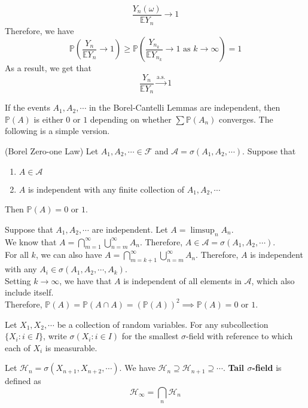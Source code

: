 \documentclass{huhtakm-template-book}
\newcommand{\prob}{\mathbb{P}}
\newcommand{\expect}{\mathbb{E}}
\begin{document}
\begin{proofing}
	\begin{equation*}
		\frac{Y_{n}(\omega)}{\expect Y_{n}}\to 1
	\end{equation*}
	Therefore, we have
	\begin{equation*}
		\prob\left(\frac{Y_{n}}{\expect Y_{n}}\to 1\right)\geq\prob\left(\frac{Y_{n_{k}}}{\expect Y_{n_{k}}}\to 1\text{ as }k\to\infty\right)=1
	\end{equation*}
	As a result, we get that
	\begin{equation*}
		\frac{Y_{n}}{\expect Y_{n}}\xrightarrow{\text{a.s.}}1
	\end{equation*}
\end{proofing}
If the events $A_{1}, A_{2},\cdots$ in the Borel-Cantelli Lemmas are independent, then $\prob(A)$ is either $0$ or $1$ depending on whether $\sum\prob(A_{n})$ converges. The following is a simple version.
\begin{thm}(Borel Zero-one Law)
	Let $A_{1},A_{2},\cdots\in\mathcal{F}$ and $\mathcal{A}=\sigma(A_{1},A_{2},\cdots)$. Suppose that
	\begin{enumerate}
		\item $A\in\mathcal{A}$
		\item $A$ is independent with any finite collection of $A_{1},A_{2},\cdots$
	\end{enumerate}
	Then $\prob(A)=0$ or $1$.
\end{thm}
\begin{proofing}
	Suppose that $A_{1},A_{2},\cdots$ are independent. Let $A=\limsup_{n}A_{n}$.\\
	We know that $A=\bigcap_{m=1}^{\infty}\bigcup_{n=m}^{\infty}A_{n}$. Therefore, $A\in\mathcal{A}=\sigma(A_{1},A_{2},\cdots)$.\\
	For all $k$, we can also have $A=\bigcap_{m=k+1}^{\infty}\bigcup_{n=m}^{\infty}A_{n}$. Therefore, $A$ is independent with any $A_{i}\in\sigma(A_{1},A_{2},\cdots,A_{k})$.\\
	Setting $k\to\infty$, we have that $A$ is independent of all elements in $\mathcal{A}$, which also include itself.\\
	Therefore, $\prob(A)=\prob(A\cap A)=(\prob(A))^{2}\implies\prob(A)=0$ or $1$.
\end{proofing}
\newpage
Let $X_{1},X_{2},\cdots$ be a collection of random variables. For any subcollection $\{X_{i}:i\in I\}$, write $\sigma(X_{i}:i\in I)$ for the smallest $\sigma$-field with reference to which each of $X_{i}$ is measurable.
\begin{defn}
	Let $\mathcal{H}_{n}=\sigma(X_{n+1},X_{n+2},\cdots)$. We have $\mathcal{H}_{n}\supseteq\mathcal{H}_{n+1}\supseteq\cdots$. \textbf{Tail $\sigma$-field} is defined as
	\begin{equation*}
		\mathcal{H}_{\infty}=\bigcap_{n}\mathcal{H}_{n}
	\end{equation*}
\end{defn}
\end{document}
